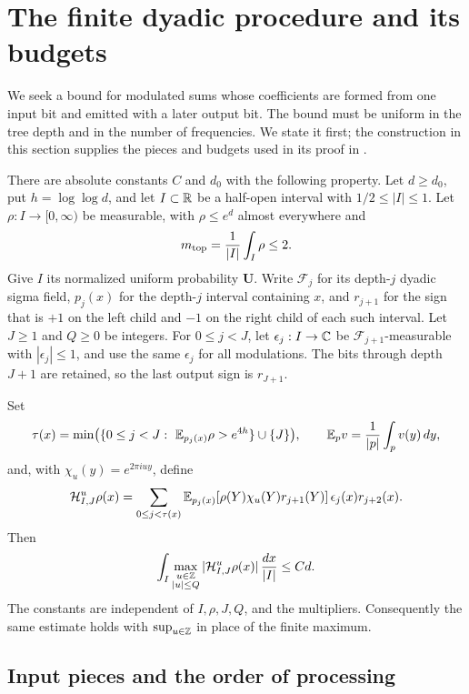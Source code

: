 \section{The finite dyadic procedure and its budgets}
\label{sec:procedure}

We seek a bound for modulated sums whose coefficients are formed from one
input bit and emitted with a later output bit. The bound must be uniform
in the tree depth and in the number of frequencies. We state it first;
the construction in this section supplies the pieces and budgets used in
its proof in .

\begin{proposition}\label{prop:dyadic}
There are absolute constants $C$ and $d_0$ with the following property.
Let $d\ge d_0$, put $h=\log\log d$, and let $I\subset\mathbb R$ be a half-open
interval with $1/2\le |I|\le1$.  Let $\rho:I\to[0,\infty)$ be measurable,
with $\rho\le e^d$ almost everywhere and
\[
 m_{\rm top}=\frac1{|I|}\int_I\rho\le2.
\]
Give $I$ its normalized uniform probability $\mathbf U$.  Write
$\mathcal F_j$ for its depth-$j$ dyadic sigma field, $p_j(x)$ for the
depth-$j$ interval containing $x$, and $r_{j+1}$ for the sign that is $+1$
on the left child and $-1$ on the right child of each such interval.
Let $J\ge1$ and $Q\ge0$ be integers.  For $0\le j<J$, let
$\epsilon_j:I\to\mathbb C$ be $\mathcal F_{j+1}$-measurable with
$|\epsilon_j|\le1$, and use the same $\epsilon_j$ for all modulations.
The bits through depth $J+1$ are retained, so the last output sign is
$r_{J+1}$.

Set
\[
 \tau(x)=\min\bigl(\{0\le j<J:\ \E_{p_j(x)}\rho>e^{4h}\}\cup\{J\}\bigr),
 \qquad \E_p v=\frac1{|p|}\int_p v(y)\,dy,
\]
and, with $\chi_u(y)=e^{2\pi iuy}$, define
\[
 \mathcal H_{I,J}^{u}\rho(x)
 =\sum_{0\le j<\tau(x)}
       \mathbb E_{p_j(x)}[\rho(Y)\chi_u(Y)r_{j+1}(Y)]\,
       \epsilon_j(x)r_{j+2}(x).
\]
Then
\begin{equation}\label{eq:dyadic-estimate}
 \int_I\max_{\substack{u\in\mathbb Z\\|u|\le Q}}
           |\mathcal H_{I,J}^{u}\rho(x)|\,\frac{dx}{|I|}
 \le Cd.
\end{equation}
The constants are independent of $I,\rho,J,Q$, and the multipliers.
Consequently the same estimate holds with $\sup_{u\in\mathbb Z}$ in place of
the finite maximum.
\end{proposition}

\subsection{Input pieces and the order of processing}


